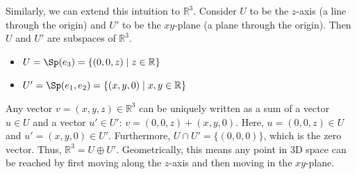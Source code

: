 \begin{center}
\end{center}

Similarly, we can extend this intuition to $\mathbb{R}^3$. Consider $U$ to be the $z$-axis (a line through the origin) and $U'$ to be the $xy$-plane (a plane through the origin). Then $U$ and $U'$ are subspaces of $\mathbb{R}^3$.
\begin{itemize}
  \item $U = \Sp(e_3) = \{(0,0,z) \mid z \in \mathbb{R}\}$
  \item $U' = \Sp(e_1, e_2) = \{(x,y,0) \mid x,y \in \mathbb{R}\}$
\end{itemize}
Any vector $v = (x,y,z) \in \mathbb{R}^3$ can be uniquely written as a sum of a vector $u \in U$ and a vector $u' \in U'$:
$v = (0,0,z) + (x,y,0)$.
Here, $u = (0,0,z) \in U$ and $u' = (x,y,0) \in U'$.
Furthermore, $U \cap U' = \{(0,0,0)\}$, which is the zero vector.
Thus, $\mathbb{R}^3 = U \oplus U'$. Geometrically, this means any point in 3D space can be reached by first moving along the $z$-axis and then moving in the $xy$-plane.

